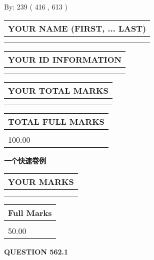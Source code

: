 \documentclass{ctexart}
\begin{document}
   
\hspace{1.0in} By: 
 239 ( 416 ,  613 )
   
   
   
   
\newpage 
\setcounter{page}{ 
   562001 } 
   
   
   
   
\noindent\begin{tabular}{|l|}
\hline
YOUR NAME (FIRST, ... LAST)  \\
\hline
 \\ 
 \\ 
\hline
\end{tabular}
\hspace{0.05in} \begin{tabular}{|l|}
\hline
 YOUR   ID   INFORMATION  \\
\hline
 \\ 
 \\ 
\hline
\end{tabular}
   
   
\vspace{0.2in}\noindent\begin{tabular}{|l|}
\hline
YOUR TOTAL MARKS  \\
\hline
 \\ 
 \\ 
\hline
\end{tabular}
\hspace{0.05in} \begin{tabular}{|l|}
\hline
TOTAL FULL MARKS  \\
\hline
 \\ 
100.00 \\
\hline
\end{tabular}
   
   
 \vspace{0.2in}
{\LARGE {\textbf{ 一个快速卷例}}}
   
   
  
\vspace{0.2in}
  
\noindent\begin{tabular}{|l|}
\hline
 YOUR MARKS  \\
\hline
 \\ 
 \\ 
\hline
\end{tabular}
\hspace{0.05in} \begin{tabular}{|l|}
\hline
 Full Marks  \\
\hline
 \\ 
50.00 \\
\hline
\end{tabular}
{\textbf{\Large{QUESTION
562.1 
}}}
  
\end{document}
